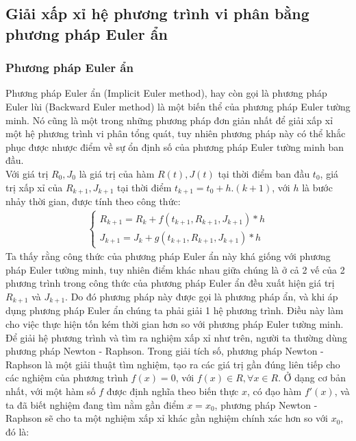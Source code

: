 \subsection{Giải xấp xỉ hệ phương trình vi phân bằng phương pháp Euler ẩn}
\subsubsection{Phương pháp Euler ẩn}
\hspace*{0.5cm} {Phương pháp Euler ẩn (Implicit Euler method), hay còn gọi là phương pháp Euler lùi (Backward Euler method) là một biến thể của phương pháp Euler tường minh. Nó cũng là một trong những phương pháp đơn giản nhất để giải xấp xỉ một hệ phương trình vi phân tổng quát, tuy nhiên phương pháp này có thể khắc phục được nhược điểm về sự ổn định số của phương pháp Euler tường minh ban đầu.}\\
\hspace*{0.5cm} {Với giá trị $R_0, J_0$ là giá trị của hàm $R(t), J(t)$ tại thời điểm ban đầu $t_0$, giá trị xấp xỉ của $R_{k+1}, J_{k+1}$ tại thời điểm $t_{k+1} = t_0 + h.(k+1)$, với $h$ là bước nhảy thời gian, được tính theo công thức:} 
\begin{align}
    \begin{cases}
        R_{k+1} = R_k + f(t_{k+1}, R_{k+1}, J_{k+1}) * h\\
        J_{k+1} = J_k + g(t_{k+1}, R_{k+1}, J_{k+1}) * h
    \end{cases}
\end{align}
\hspace*{0.5cm} {Ta thấy rằng công thức của phương pháp Euler ẩn này khá giống với phương pháp Euler tường minh, tuy nhiên điểm khác nhau giữa chúng là ở cả 2 vế của 2 phương trình trong công thức của phương pháp Euler ẩn đều xuất hiện giá trị $R_{k+1}$ và $J_{k+1}$. Do đó phương pháp này được gọi là phương pháp ẩn, và khi áp dụng phương pháp Euler ẩn chúng ta phải giải 1 hệ phương trình. Điều này làm cho việc thực hiện tốn kém thời gian hơn so với phương pháp Euler tường minh.}\\
\hspace*{0.5cm} {Để giải hệ phương trình và tìm ra nghiệm xấp xỉ như trên, người ta thường dùng phương pháp Newton - Raphson. Trong giải tích số, phương pháp Newton - Raphson là một giải thuật tìm nghiệm, tạo ra các giá trị gần đúng liên tiếp cho các nghiệm của phương trình $f(x) = 0$, với $f(x) \in R, \forall x \in R$. Ở dạng cơ bản nhất, với một hàm số $f$ được định nghĩa theo biến thực $x$, có đạo hàm $f'(x)$, và ta đã biết nghiệm đang tìm nằm gần điểm $x = x_0$, phương pháp Newton - Raphson sẽ cho ta một nghiệm xấp xỉ khác gần nghiệm chính xác hơn so với $x_0$, đó là:}\\
